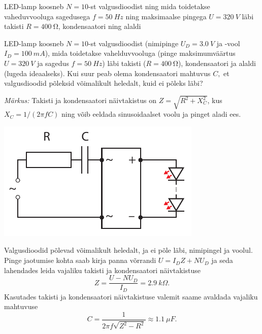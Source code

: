
LED-lamp koosneb $N=10$-st valgusdioodist ning mida toidetakse vaheduvvooluga sagedusega $f=\SI{50}{Hz}$ ning maksimaalse pingega $U=\SI{320}{V}$ läbi takisti $R=\SI{400}{\ohm}$, kondensaatori ning alaldi

LED-lamp koosneb $N=10$-st valgusdioodist (nimipinge $U_{D}=\SI{3.0}{V}$ ja -vool $I_{D}=\SI{100}{mA}$), mida toidetakse vahelduvvooluga (pinge maksimumväärtus $U=\SI{320}{V}$ ja sagedus $f=\SI{50}{Hz}$) läbi takisti ($R=\SI{400}{\ohm}$), kondensaatori ja alaldi (lugeda ideaalseks). Kui suur peab olema kondensaatori mahtuvus $C,$ et valgusdioodid põleksid võimalikult heledalt, kuid ei põleks läbi?

\emph{Märkus:} Takisti ja kondensaatori näivtakistus on $Z=\sqrt{R^{2}+X_{C}^{2}}$, kus $X_{C}=1/\left(2\pi fC\right)$ ning võib eeldada sinusoidaalset voolu ja pinget aladi ees.
\begin{center}
	\includegraphics[width=0.6\linewidth]{2019-lahg-06-yl.pdf}
\end{center}\hint

\solu
Valgusdioodid põlevad võimalikult heledalt, ja ei põle läbi, nimipingel
ja voolul. Pinge jaotumise kohta saab kirja panna võrrandi $U=I_{D}Z+NU_{D}$
ja seda lahendades leida vajaliku takisti ja kondensaatori näivtakistuse 
\begin{equation*}
Z=\frac{U-NU_{D}}{I_{D}}=\SI{2.9}{k\Omega}.
\end{equation*}
Kasutades takisti ja kondensaatori näivtakistuse valemit saame avaldada
vajaliku mahtuvuse
\begin{equation*}
C=\frac{1}{2\pi f\sqrt{Z^{2}-R^{2}}}\approx\SI{1.1}{\mu F}.
\end{equation*}
\probend